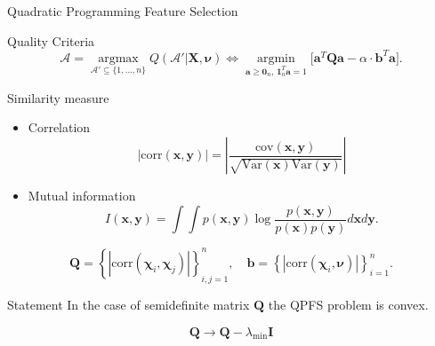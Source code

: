 \documentclass[9pt]{beamer}
\newcommand{\bx}{\mathbf{x}}
\newcommand{\by}{\mathbf{y}}
\newcommand{\ba}{\mathbf{a}}
\newcommand{\bb}{\mathbf{b}}
\newcommand{\bX}{\mathbf{X}}
\newcommand{\bQ}{\mathbf{Q}}
\newcommand{\cA}{\mathcal{A}}
\newcommand{\bchi}{\boldsymbol{\chi}}
\newcommand{\bnu}{\boldsymbol{\nu}}
\newcommand{\bOne}{\boldsymbol{1}}
\newcommand{\bZero}{\boldsymbol{0}}
\newcommand{\argmin}{\mathop{\arg \min}\limits}
\newcommand{\argmax}{\mathop{\arg \max}\limits}
\begin{document}
\begin{frame}{Quadratic Programming Feature Selection}
	
	\begin{block}{Quality Criteria}
		\[
		\cA = \argmax_{\cA' \subseteq \{1, \dots, n\}} Q(\cA' | \bX, \bnu) \Leftrightarrow \argmin_{\ba \geq \bZero_n, \, \bOne_n^T\ba=1} \bigl[\ba^{T} \bQ \ba - \alpha \cdot \mathbf{b}^{T} \ba \bigr].
		\]
		\vspace{-0.5cm}
	\end{block}
	\begin{block}{Similarity measure}
		\begin{itemize}
			\item Correlation
			\vspace{-0.1cm}
			\[
			\left|\text{corr}(\bx, \by)\right| = \left| \frac{\mathrm{cov}(\bx, \by)}{\sqrt{\mathrm{Var}(\bx) \mathrm{Var}(\by)}} \right|
			\]
			\vspace{-0.3cm}
			\item Mutual information
			\vspace{-0.1cm}
			\[
			I(\bx, \by) = \int \int p(\bx, \by) \log \frac{p(\bx, \by)}{p(\bx) p(\by)} d\bx d\by.
			\]
			\vspace{-0.5cm}
		\end{itemize}
	\end{block}
	\[
	\bQ = \left\{\left|\text{corr}(\bchi_i, \bchi_j)\right|\right\}_{i,j=1}^n, \quad \bb = \left\{\left|\text{corr}(\bchi_i, \bnu)\right|\right\}_{i=1}^n.
	\]
	\vspace{-0.5cm}
	\begin{block}{Statement}
		In the case of semidefinite matrix $\bQ$ the QPFS problem is convex.
	\end{block}
	\begin{equation*}
	\bQ \rightarrow \bQ - \lambda_{\min} \mathbf{I}	
	\end{equation*}
\end{frame}
\end{document}
